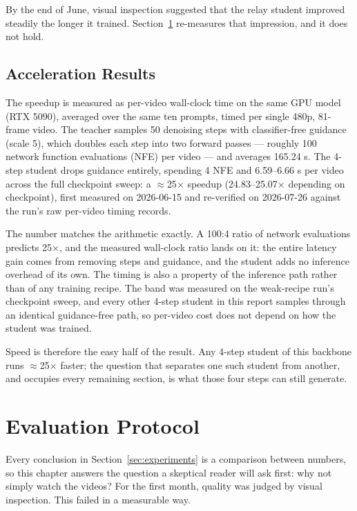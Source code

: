 \documentclass[11pt,a4paper]{article}
\begin{document}
By the end of June, visual inspection suggested that the relay student improved steadily the longer it trained. Section~\ref{sec:protocol} re-measures that impression, and it does not hold.

\subsection{Acceleration Results}\label{sec:training-acceleration}

The speedup is measured as per-video wall-clock time on the same GPU model (RTX 5090), averaged over the same ten prompts, timed per single 480p, 81-frame video. The teacher samples 50 denoising steps with classifier-free guidance (scale 5), which doubles each step into two forward passes — roughly 100 network function evaluations (NFE) per video — and averages 165.24 s. The 4-step student drops guidance entirely, spending 4 NFE and 6.59–6.66 s per video across the full checkpoint sweep: a $\approx$25$\times$ speedup (24.83–25.07$\times$ depending on checkpoint), first measured on 2026-06-15 and re-verified on 2026-07-26 against the run's raw per-video timing records.

The number matches the arithmetic exactly. A 100:4 ratio of network evaluations predicts 25$\times$, and the measured wall-clock ratio lands on it: the entire latency gain comes from removing steps and guidance, and the student adds no inference overhead of its own. The timing is also a property of the inference path rather than of any training recipe. The band was measured on the weak-recipe run's checkpoint sweep, and every other 4-step student in this report samples through an identical guidance-free path, so per-video cost does not depend on how the student was trained.

Speed is therefore the easy half of the result. Any 4-step student of this backbone runs $\approx$25$\times$ faster; the question that separates one such student from another, and occupies every remaining section, is what those four steps can still generate.

\section{Evaluation Protocol}\label{sec:protocol}

Every conclusion in Section~\ref{sec:experiments} is a comparison between numbers, so this chapter answers the question a skeptical reader will ask first: why not simply watch the videos? For the first month, quality was judged by visual inspection. This failed in a measurable way.
\end{document}
